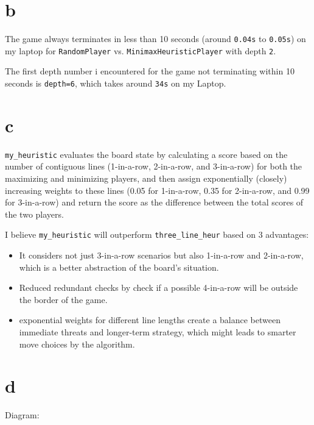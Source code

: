 \documentclass[12pt]{article}
\begin{document}
\subsection{} 
\begin{enumerate}
	
\part{b} 
	
	The game always terminates in less than 10 seconds (around \texttt{0.04s} to \texttt{0.05s}) on my laptop for \texttt{RandomPlayer} vs. \texttt{MinimaxHeuristicPlayer} with depth \texttt{2}.
	
	The first depth number i encountered for the game not terminating within 10 seconds is \texttt{depth=6}, which takes around \texttt{34s} on my Laptop.

\part{c} 
	
	\texttt{my\_heuristic} evaluates the board state by calculating a score based on the number of contiguous lines (1-in-a-row, 2-in-a-row, and 3-in-a-row) for both the maximizing and minimizing players, and then assign exponentially (closely) increasing weights to these lines (0.05 for 1-in-a-row, 0.35 for 2-in-a-row, and 0.99 for 3-in-a-row) and return the score as the difference between the total scores of the two players.
	
	I believe \texttt{my\_heuristic} will outperform \texttt{three\_line\_heur} based on 3 advantages:
	\begin{itemize}
		\item It considers not just 3-in-a-row scenarios but also 1-in-a-row and 2-in-a-row, which is a better abstraction of the board's situation.
		\item Reduced redundant checks by check if a possible 4-in-a-row will be outside the border of the game.
		\item exponential weights for different line lengths create a balance between immediate threats and longer-term strategy, which might leads to smarter move choices by the algorithm.
		
	\end{itemize}

\part{d} Diagram:


\end{enumerate}
\end{document}
